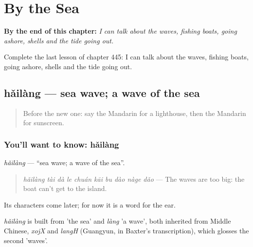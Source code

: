 
\chapter{By the Sea}
\label{ch:zh-by-the-sea}

\begin{chapteropening}
\textbf{By the end of this chapter:} \emph{I can talk about the waves, fishing boats, going ashore, shells and the tide going out.}

Complete the last lesson of chapter 445: I can talk about the waves, fishing boats, going ashore, shells and the tide going out.
\end{chapteropening}

\section[hǎilàng]{hǎilàng — sea wave; a wave of the sea}

\label{lesson:ZH-C445-hailang}



\begin{quote}
Before the new one: say the Mandarin for a lighthouse, then the Mandarin for sunscreen.
\end{quote}

\subsection*{You'll want to know: hǎilàng}
\emph{hǎilàng} — \textquotedblleft{}sea wave; a wave of the sea\textquotedblright{}.

\begin{quote}
\emph{hǎilàng tài dà le chuán kāi bu dào nàge dǎo} — The waves are too big: the boat can't get to the island.
\end{quote}

Its characters come later; for now it is a word for the ear.

\begin{cousinweb}
\emph{hǎilàng} is built from  'the sea' and \emph{làng} 'a wave', both inherited from Middle Chinese, \emph{xojX} and \emph{langH} (Guangyun, in Baxter's transcription), which glosses the second 'waves'.
\end{cousinweb}


